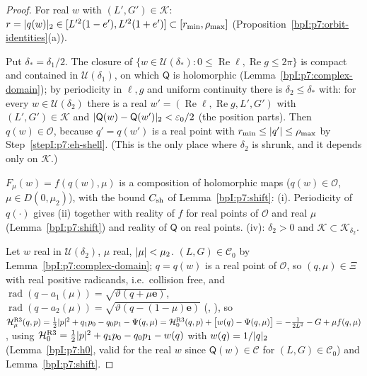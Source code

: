 \begin{proof}
\label{stepI:p7:eh-shell} For real $w$ with $(L',G')\in\mathcal K$: $r=\lvert q(w)\rvert_2\in[L'^2(1-e'),L'^2(1+e')]\subset[r_{\min},\rho_{\max}]$ (Proposition~\ref{bpI:p7:orbit-identities}(a)).

\label{stepI:p7:eh-delta} Put $\delta_*=\delta_1/2$. The closure of $\{w\in\mathcal U(\delta_*):0\le\operatorname{Re}\ell,\operatorname{Re}g\le2\pi\}$ is compact and contained in $\mathcal U(\delta_1)$, on which $\mathsf Q$ is holomorphic (Lemma~\ref{bpI:p7:complex-domain}); by periodicity in $\ell,g$ and uniform continuity there is $\delta_2\le\delta_*$ with: for every $w\in\mathcal U(\delta_2)$ there is a real $w'=(\operatorname{Re}\ell,\operatorname{Re}g,L',G')$ with $(L',G')\in\mathcal K$ and $\lvert \mathsf Q(w)-\mathsf Q(w')\rvert_2<\varepsilon_0/2$ (the position parts). Then $q(w)\in\mathcal O$, because $q'=q(w')$ is a real point with $r_{\min}\le\lvert q'\rvert\le\rho_{\max}$ by Step~\ref{stepI:p7:eh-shell}.
(This is the only place where $\delta_2$ is shrunk, and it depends only on $\mathcal K$.)

\label{stepI:p7:eh-hol} $F_\mu(w)=f(q(w),\mu)$ is a composition of holomorphic maps ($q(w)\in\mathcal O$, $\mu\in D(0,\mu_2)$), with the bound $C_{\rm sh}$ of Lemma~\ref{bpI:p7:shift}: (i). Periodicity of $q(\cdot)$ gives (ii) together with reality of $f$ for real points of $\mathcal O$ and real $\mu$ (Lemma~\ref{bpI:p7:shift}) and reality of $\mathsf Q$ on real points. (iv): $\delta_2>0$ and $\mathcal K\subset\mathcal K_{\delta_2}$.

\label{stepI:p7:eh-exact} Let $w$ real in $\mathcal U(\delta_2)$, $\mu$ real, $\lvert \mu\rvert<\mu_2$. $(L,G)\in\mathcal C_0$ by Lemma~\ref{bpI:p7:complex-domain}; $q=q(w)$ is a real point of $\mathcal O$, so $(q,\mu)\in\Xi$ with real positive radicands, i.e.\ collision free, and $\operatorname{rad}(q-a_1(\mu))=\sqrt{\vartheta(q+\mu\mathbf e)}$, $\operatorname{rad}(q-a_2(\mu))=\sqrt{\vartheta(q-(1-\mu)\mathbf e)}$ (, ), so
$\mathcal H^{\rm R3}_\mu(q,p)=\tfrac12\lvert p\rvert^2+q_1p_0-q_0p_1-\Psi(q,\mu)=\mathcal H^{\rm R3}_0(q,p)+\bigl[w(q)-\Psi(q,\mu)\bigr]=-\frac1{2L^2}-G+\mu f(q,\mu)$,
using $\mathcal H^{\rm R3}_0=\tfrac12\lvert p\rvert^2+q_1p_0-q_0p_1-w(q)$ with $w(q)=1/\lvert q\rvert_2$ (Lemma~\ref{bpI:p7:h0}, valid for the real $w$ since $\mathsf Q(w)\in\mathcal C$ for $(L,G)\in\mathcal C_0$) and Lemma~\ref{bpI:p7:shift}.
\end{proof}

